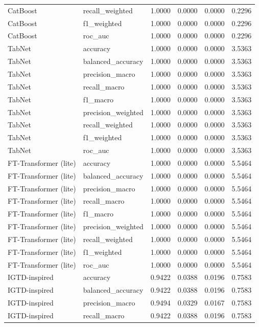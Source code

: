 \begin{tabular}{llrrrr}
CatBoost & recall_weighted & 1.0000 & 0.0000 & 0.0000 & 0.2296 \\
CatBoost & f1_weighted & 1.0000 & 0.0000 & 0.0000 & 0.2296 \\
CatBoost & roc_auc & 1.0000 & 0.0000 & 0.0000 & 0.2296 \\
TabNet & accuracy & 1.0000 & 0.0000 & 0.0000 & 3.5363 \\
TabNet & balanced_accuracy & 1.0000 & 0.0000 & 0.0000 & 3.5363 \\
TabNet & precision_macro & 1.0000 & 0.0000 & 0.0000 & 3.5363 \\
TabNet & recall_macro & 1.0000 & 0.0000 & 0.0000 & 3.5363 \\
TabNet & f1_macro & 1.0000 & 0.0000 & 0.0000 & 3.5363 \\
TabNet & precision_weighted & 1.0000 & 0.0000 & 0.0000 & 3.5363 \\
TabNet & recall_weighted & 1.0000 & 0.0000 & 0.0000 & 3.5363 \\
TabNet & f1_weighted & 1.0000 & 0.0000 & 0.0000 & 3.5363 \\
TabNet & roc_auc & 1.0000 & 0.0000 & 0.0000 & 3.5363 \\
FT-Transformer (lite) & accuracy & 1.0000 & 0.0000 & 0.0000 & 5.5464 \\
FT-Transformer (lite) & balanced_accuracy & 1.0000 & 0.0000 & 0.0000 & 5.5464 \\
FT-Transformer (lite) & precision_macro & 1.0000 & 0.0000 & 0.0000 & 5.5464 \\
FT-Transformer (lite) & recall_macro & 1.0000 & 0.0000 & 0.0000 & 5.5464 \\
FT-Transformer (lite) & f1_macro & 1.0000 & 0.0000 & 0.0000 & 5.5464 \\
FT-Transformer (lite) & precision_weighted & 1.0000 & 0.0000 & 0.0000 & 5.5464 \\
FT-Transformer (lite) & recall_weighted & 1.0000 & 0.0000 & 0.0000 & 5.5464 \\
FT-Transformer (lite) & f1_weighted & 1.0000 & 0.0000 & 0.0000 & 5.5464 \\
FT-Transformer (lite) & roc_auc & 1.0000 & 0.0000 & 0.0000 & 5.5464 \\
IGTD-inspired & accuracy & 0.9422 & 0.0388 & 0.0196 & 0.7583 \\
IGTD-inspired & balanced_accuracy & 0.9422 & 0.0388 & 0.0196 & 0.7583 \\
IGTD-inspired & precision_macro & 0.9494 & 0.0329 & 0.0167 & 0.7583 \\
IGTD-inspired & recall_macro & 0.9422 & 0.0388 & 0.0196 & 0.7583 \\

\end{tabular}
